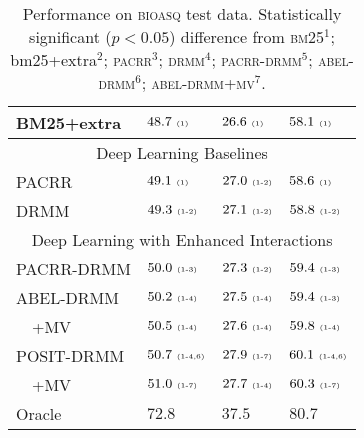 \documentclass[11pt,a4paper]{article}
\newcommand{\st}[1]{\ {\tiny \mbox{(#1)}}\xspace}
\newcommand{\bioasq}{\textsc{bioasq}\xspace}
\newcommand{\drmm}{\textsc{drmm}\xspace}
\newcommand{\pacrr}{\textsc{pacrr}\xspace}
\newcommand{\pacrrdrmm}{\textsc{pacrr-drmm}\xspace}
\newcommand{\abeldrmm}{\textsc{abel-drmm}\xspace}
\newcommand{\abeldrmmmv}{\textsc{abel-drmm+mv}\xspace}
\newcommand{\bmtf}{\textsc{bm25}\xspace}
\begin{document}
\begin{table*}[t]
\begin{minipage}{3.1in}
\begin{center}
\begin{tabular}{|llll|}
BM25+extra  & $48.7\st{1}$ & $26.6\st{1}$ & $58.1\st{1}$ \\ \hline
\multicolumn{4}{|c|}{Deep Learning Baselines} \\ \hline
PACRR       & $49.1\st{1}$ & $27.0\st{1-2}$ & $58.6\st{1}$ \\
DRMM        & $49.3\st{1-2}$ & $27.1\st{1-2}$ & $58.8\st{1-2}$ \\ \hline
\multicolumn{4}{|c|}{Deep Learning with Enhanced Interactions} \\ \hline
PACRR-DRMM  & $50.0\st{1-3}$ & $27.3\st{1-2}$ & $59.4\st{1-3}$ \\
ABEL-DRMM   & $50.2\st{1-4}$ & $27.5\st{1-4}$ & $59.4\st{1-3}$ \\
$\quad$+MV  & $50.5\st{1-4}$ & $27.6\st{1-4}$ & $59.8\st{1-4}$ \\
POSIT-DRMM  & $50.7\st{1-4,6}$ & $27.9\st{1-7}$ & $60.1\st{1-4,6}$ \\
$\quad$+MV  & $51.0\st{1-7}$ & $27.7\st{1-4}$ & $60.3\st{1-7}$\\ \hline\hline
Oracle      & $72.8$ & $37.5$ & $80.7$ \\ \hline
\end{tabular}
\end{center}
\end{minipage}
\vspace{-0.1in}
\caption{Performance on \bioasq test data. Statistically significant ($p < 0.05$)
difference from  \bmtf$\!\!\!^1$; {\sc bm25}+extra$^2$; \pacrr$\!\!^3$; \drmm$\!^4$; \pacrrdrmm$\!^5$; \abeldrmm$\!^6$; \abeldrmmmv$\!^7$.}
\vspace{-1mm}
\label{tab:bioasq-main}
\end{table*}
\end{document}
